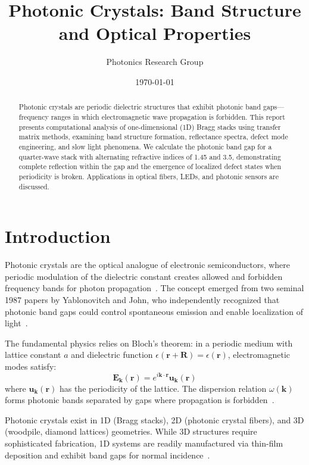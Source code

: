 \documentclass[11pt,a4paper]{article}
\title{Photonic Crystals: Band Structure and Optical Properties}
\author{Photonics Research Group}
\date{\today}
\begin{document}
\maketitle

\begin{abstract}
Photonic crystals are periodic dielectric structures that exhibit photonic band gaps—frequency ranges in which electromagnetic wave propagation is forbidden. This report presents computational analysis of one-dimensional (1D) Bragg stacks using transfer matrix methods, examining band structure formation, reflectance spectra, defect mode engineering, and slow light phenomena. We calculate the photonic band gap for a quarter-wave stack with alternating refractive indices of 1.45 and 3.5, demonstrating complete reflection within the gap and the emergence of localized defect states when periodicity is broken. Applications in optical fibers, LEDs, and photonic sensors are discussed.
\end{abstract}

\section{Introduction}

Photonic crystals are the optical analogue of electronic semiconductors, where periodic modulation of the dielectric constant creates allowed and forbidden frequency bands for photon propagation~\cite{Joannopoulos2008,Yablonovitch1987}. The concept emerged from two seminal 1987 papers by Yablonovitch and John, who independently recognized that photonic band gaps could control spontaneous emission and enable localization of light~\cite{Yablonovitch1987,John1987}.

The fundamental physics relies on Bloch's theorem: in a periodic medium with lattice constant $a$ and dielectric function $\epsilon(\mathbf{r} + \mathbf{R}) = \epsilon(\mathbf{r})$, electromagnetic modes satisfy:
\begin{equation}
\mathbf{E}_{\mathbf{k}}(\mathbf{r}) = e^{i\mathbf{k}\cdot\mathbf{r}} \mathbf{u}_{\mathbf{k}}(\mathbf{r})
\end{equation}
where $\mathbf{u}_{\mathbf{k}}(\mathbf{r})$ has the periodicity of the lattice. The dispersion relation $\omega(\mathbf{k})$ forms photonic bands separated by gaps where propagation is forbidden~\cite{Joannopoulos2008}.

Photonic crystals exist in 1D (Bragg stacks), 2D (photonic crystal fibers), and 3D (woodpile, diamond lattices) geometries. While 3D structures require sophisticated fabrication, 1D systems are readily manufactured via thin-film deposition and exhibit band gaps for normal incidence~\cite{Yeh1988,Macleod2010}.
\end{document}
